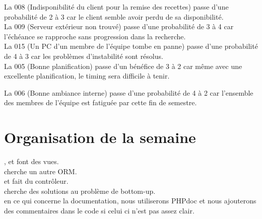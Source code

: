 \documentclass [a4paper] {article}
\begin{document}
La \FDR{} 008 (Indisponibilité du client pour la remise des recettes) passe d'une probabilité de 2 à 3 car le client semble avoir perdu de sa disponibilité.\\

La \FDR{} 009 (Serveur extérieur non trouvé) passe d'une probabilité de 3 à 4 car l'échéance se rapproche sans progression dans la recherche.\\

La \FDR{} 015 (Un PC d’un membre de l’équipe tombe en panne) passe d'une probabilité de 4 à 3 car les problèmes d'instabilité sont résolus.\\

La \FDO{} 005 (Bonne planification) passe d'un bénéfice de 3 à 2 car même avec une excellente planification, le timing sera difficile à tenir.

La \FDO{} 006 (Bonne ambiance interne) passe d'une probabilité de 4 à 2 car l'ensemble des membres de l'équipe est fatiguée par cette fin de semestre.



\section{Organisation de la semaine}
\Matthieu, \Julie{} et \Mathieu{} font des vues.\\
\Melissa{} cherche un autre ORM.\\
\Florian{} et \Kafui{} fait du contrôleur.\\
\Michel cherche des solutions au problème de bottom-up.\\

en ce qui concerne la documentation, nous utiliserons PHPdoc et nous ajouterons des commentaires dans le code si celui ci n'est pas assez clair.



\end{document}
